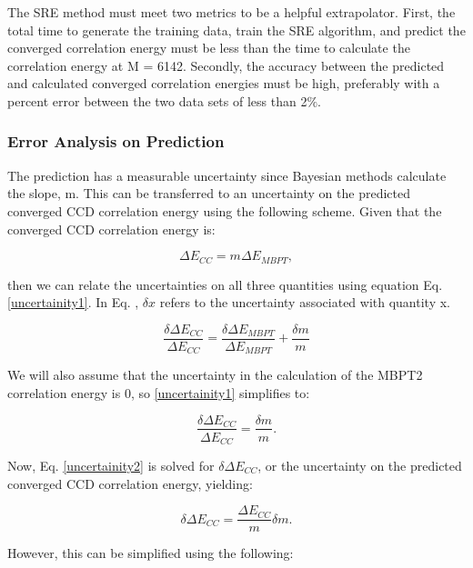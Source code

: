 The SRE method must meet two metrics to be a helpful extrapolator. First, the total time to generate the training data, train the SRE algorithm, and predict the converged correlation energy must be less than the time to calculate the correlation energy at M = 6142. Secondly, the accuracy between the predicted and calculated converged correlation energies must be high, preferably with a percent error between the two data sets of less than 2$\%$.

\subsubsection* {Error Analysis on Prediction}

The prediction has a measurable uncertainty since Bayesian methods calculate the slope, m. This can be transferred to an uncertainty on the predicted converged CCD correlation energy using the following scheme. Given that the converged CCD correlation energy is:

\begin{equation}
    \Delta E_{CC} = m\Delta E_{MBPT},
\end{equation}

then we can relate the uncertainties on all three quantities using equation Eq. \ref{uncertainity1}.  In Eq. \label{uncertainity1}, $\delta x$ refers to the uncertainty associated with quantity x.

\begin{equation}\label{uncertainity1}
    \frac{\delta \Delta E_{CC}}{\Delta E_{CC}} = \frac{\delta \Delta E_{MBPT}}{\Delta E_{MBPT}} + \frac{\delta m}{m}
\end{equation}

We will also assume that the uncertainty in the calculation of the MBPT2 correlation energy is 0, so \ref{uncertainity1} simplifies to:

\begin{equation}\label{uncertainity2}
    \frac{\delta \Delta E_{CC}}{\Delta E_{CC}} = \frac{\delta m}{m}.
\end{equation}

Now, Eq. \ref{uncertainity2} is solved for $\delta \Delta E_{CC}$, or the uncertainty on the predicted converged CCD correlation energy, yielding:

\begin{equation}
    \delta \Delta E_{CC} = \frac{\Delta E_{CC}}{m}\delta m.
\end{equation}

However, this can be simplified using the following:

